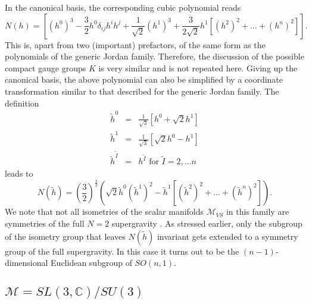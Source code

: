 \documentclass[a4paper,11pt]{article}
\newcommand{\ti}{\ensuremath{\tilde{I}}}
\newcommand{\M}{\ensuremath{\mathcal{M}}}
\begin{document}
\begin{appendix}
In the canonical basis, the corresponding cubic polynomial reads
\begin{equation}
N(h)=\left[(h^{0})^{3}-\frac{3}{2}h^{0}
\delta_{ij}h^{i}h^{j}+\frac{1}{\sqrt{2}}(h^{1})^{3}
+\frac{3}{2\sqrt{2}} h^{1}[(h^{2})^{2}+\ldots
+(h^{n})^{2}]\right].
\label{ngJ}
\end{equation}
This is, apart from two (important) prefactors, of the same form
as the polynomials of the generic Jordan family. Therefore, the
discussion of the possible compact  gauge groups $K$ is very
similar and is not repeated here. Giving up the canonical
basis, the above polynomial can also be simplified by a coordinate
transformation similar to that described for the generic Jordan
family. The definition
\begin{eqnarray}
{\tilde{h}}^{0}&=&\frac{1}{\sqrt{3}}[h^{0}+\sqrt{2}h^{1}]\nonumber\\
{\tilde{h}}^{1}&=&\frac{1}{\sqrt{3}}[\sqrt{2}h^{0}-h^{1}]\nonumber\\
{\tilde{h}}^{\ti}&=&h^{\ti} \textrm{ for } \ti=2,\ldots n\nonumber
\end{eqnarray}
leads to
\begin{displaymath}
N(\tilde{h})=\left(\frac{3}{2}\right)^{\frac{3}{2}}\left(
\sqrt{2}{\tilde{h}}^{0}
({\tilde{h}}^{1})^{2}-
{\tilde{h}}^{1}[({\tilde{h}}^{2})^{2}+\ldots
+({\tilde{h}}^{n})^{2}]\right).
\end{displaymath}
We note that not all isometries of the scalar manifolds $\M_{VS}$ in this
family are symmetries of the full $N=2$ supergravity \cite{dWvP1}. As
stressed earlier, only the subgroup of the isometry group that leaves
$N(\tilde{h})$ invariant gets extended to a symmetry group of the full
supergravity. In this case it turns out to be the $(n-1)$-dimensional
Euclidean subgroup of $SO(n,1)$. 

\subsection{$\M=SL(3,\mathbb{C})/SU(3)$}


\end{appendix}
\end{document}
